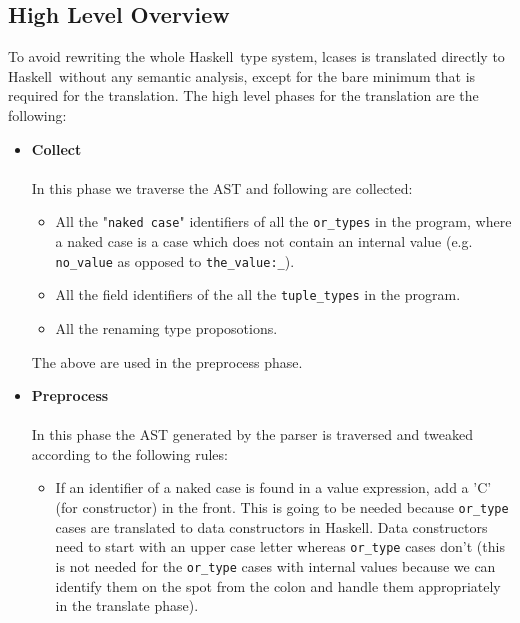 \documentclass{article}
\def\H{Haskell}
\begin{document}
\subsection{High Level Overview}

To avoid rewriting the whole \H\ type system, lcases is translated directly
to \H\ without any semantic analysis, except for the bare minimum that is
required for the translation. The high level phases for the translation are
the following:

\begin{itemize}
\item
\textbf{Collect}\\\\
In this phase we traverse the AST and following are collected:

\begin{itemize}
\item
All the "\texttt{naked case}" identifiers of all the \verb|or_types| in the
program, where a naked case is a case which does not contain an internal value
(e.g. \verb|no_value| as opposed to \verb|the_value:_|).

\item
All the field identifiers of the all the \verb|tuple_types| in the program.

\item
All the renaming type proposotions.

\end{itemize}

The above are used in the preprocess phase.

\item
\textbf{Preprocess}\\\\
In this phase the AST generated by the parser is traversed and tweaked
according to the following rules:

\begin{itemize}
\item
If an identifier of a naked case is found in a value expression, add a 'C' (for
constructor) in the front. This is going to be needed because \verb|or_type|
cases are translated to data constructors in \H. Data constructors need to
start with an upper case letter whereas \verb|or_type| cases don't
(this is not needed for the \verb|or_type| cases with internal values
because we can identify them on the spot from the colon and handle them
appropriately in the translate phase).\\


\end{itemize}
\end{itemize}
\end{document}
